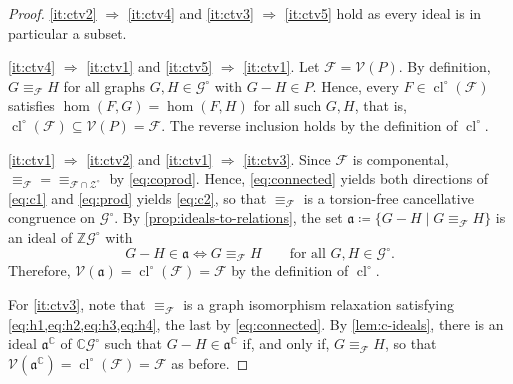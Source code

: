 \documentclass[11pt]{scrartcl}
\theoremstyle{definition}
\theoremstyle{plain}
\theoremstyle{remark}
\DeclareMathOperator{\cl}{cl}
\newcommand{\lG}{\mathcal{G}^\circ}
\newcommand{\lZ}{\mathcal{Z}^\circ}
\begin{document}
    \begin{proof}
        \ref{it:ctv2} $\Rightarrow$ \ref{it:ctv4} and \ref{it:ctv3} $\Rightarrow$ \ref{it:ctv5}
        hold as every ideal is in particular a subset.

        \ref{it:ctv4} $\Rightarrow$ \ref{it:ctv1} and \ref{it:ctv5} $\Rightarrow$ \ref{it:ctv1}.
        Let $\mathcal{F} = \mathcal{V}(P)$.
        By definition, $G \equiv_{\mathcal{F}} H$ for all graphs $G, H \in \lG$ with $G - H \in P$.
        Hence, every $F \in \cl^\circ(\mathcal{F})$ satisfies $\hom(F,G) = \hom(F,H)$ for all such $G, H$,
        that is, $\cl^\circ(\mathcal{F}) \subseteq \mathcal{V}(P) = \mathcal{F}$.
        The reverse inclusion holds by the definition of $\cl^\circ$.

        \ref{it:ctv1} $\Rightarrow$ \ref{it:ctv2} and \ref{it:ctv1} $\Rightarrow$ \ref{it:ctv3}.
        Since $\mathcal{F}$ is componental, ${\equiv_{\mathcal{F}}} = {\equiv_{\mathcal{F} \cap \lZ}}$ by \eqref{eq:coprod}.
        Hence, \eqref{eq:connected} yields both directions of \eqref{eq:c1}
        and \eqref{eq:prod} yields \eqref{eq:c2},
        so that $\equiv_{\mathcal{F}}$ is a torsion-free cancellative congruence on $\lG$.
        By \cref{prop:ideals-to-relations}, the set $\mathfrak{a} \coloneqq \{G - H \mid G \equiv_{\mathcal{F}} H\}$
        is an ideal of $\mathbb{Z}\lG$ with
        \begin{equation}\label{eq:V-differences}
            G - H \in \mathfrak{a} \iff G \equiv_{\mathcal{F}} H
            \qquad \text{for all } G, H \in \lG.
        \end{equation}
        Therefore, $\mathcal{V}(\mathfrak{a}) = \cl^\circ(\mathcal{F}) = \mathcal{F}$ by the definition of $\cl^\circ$.

        For \ref{it:ctv3}, note that $\equiv_{\mathcal{F}}$ is a graph isomorphism relaxation
        satisfying \cref{eq:h1,eq:h2,eq:h3,eq:h4}, the last by \eqref{eq:connected}.
        By \cref{lem:c-ideals}, there is an ideal $\mathfrak{a}^{\mathbb{C}}$ of $\mathbb{C}\lG$
        such that $G - H \in \mathfrak{a}^{\mathbb{C}}$ if, and only if, $G \equiv_{\mathcal{F}} H$,
        so that $\mathcal{V}(\mathfrak{a}^{\mathbb{C}}) = \cl^\circ(\mathcal{F}) = \mathcal{F}$ as before.


\end{proof}
\end{document}
